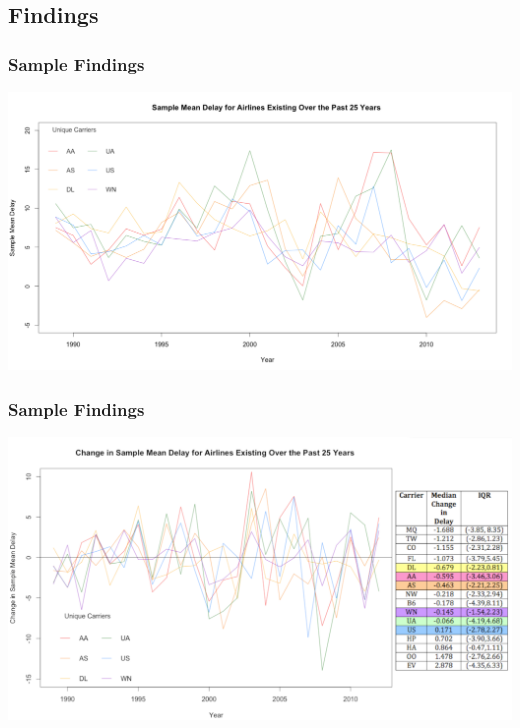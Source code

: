 \documentclass{beamer}
\begin{document}
\subsection{Findings}
\begin{frame}
\frametitle{Sample Findings}
\begin{center} 
\includegraphics[width=1 \textwidth]{sampMean}
\end{center}

\end{frame}

\begin{frame}
\frametitle{Sample Findings}
\begin{center} 
\includegraphics[width=1 \textwidth]{summarySamp}
\end{center}

\end{frame}
\end{document}
